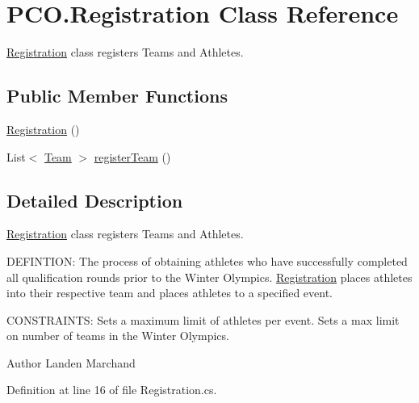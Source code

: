 \hypertarget{classPCO_1_1Registration}{\section{P\+C\+O.\+Registration Class Reference}
\label{classPCO_1_1Registration}
}


\hyperlink{classPCO_1_1Registration}{Registration} class registers Teams and Athletes.  


\subsection*{Public Member Functions}
\begin{DoxyCompactItemize}
\item 
\hyperlink{classPCO_1_1Registration_a74519be4876c47630ca2b5f5084d48eb}{Registration} ()
\item 
List$<$ \hyperlink{classPCO_1_1Team}{Team} $>$ \hyperlink{classPCO_1_1Registration_ab5854210421c2f480d8a50bf87b4e739}{register\+Team} ()
\end{DoxyCompactItemize}


\subsection{Detailed Description}
\hyperlink{classPCO_1_1Registration}{Registration} class registers Teams and Athletes. 

D\+E\+F\+I\+N\+T\+I\+O\+N\+: The process of obtaining athletes who have successfully completed all qualification rounds prior to the Winter Olympics. \hyperlink{classPCO_1_1Registration}{Registration} places athletes into their respective team and places athletes to a specified event.

C\+O\+N\+S\+T\+R\+A\+I\+N\+T\+S\+: Sets a maximum limit of athletes per event. Sets a max limit on number of teams in the Winter Olympics.\begin{DoxyAuthor}{Author}
Landen Marchand 
\end{DoxyAuthor}


Definition at line 16 of file Registration.\+cs.



